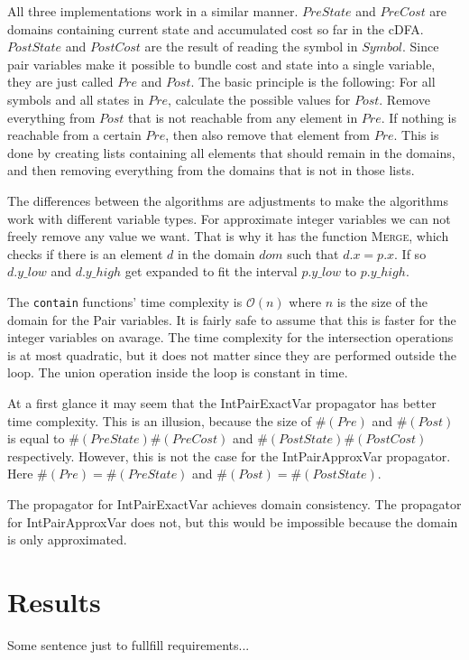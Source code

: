 \documentclass[a4paper,11pt]{article}
\begin{document}
All three implementations work in a similar manner. $PreState$ and $PreCost$ are domains containing current state and accumulated cost so far in the cDFA. $PostState$ and $PostCost$ are the result of reading the symbol in $Symbol$. Since pair variables make it possible to bundle cost and state into a single variable, they are just called $Pre$ and $Post$. The basic principle is the following: For all symbols and all states in $Pre$, calculate the possible values for $Post$. Remove everything from $Post$ that is not reachable from any element in $Pre$. If nothing is reachable from a certain $Pre$, then also remove that element from $Pre$. This is done by creating lists containing all elements that should remain in the domains, and then removing everything from the domains that is not in those lists.



The differences between the algorithms are adjustments to make the algorithms work with different variable types. For approximate integer variables we can not freely remove any value we want. That is why it has the function \textsc{Merge}, which checks if there is an element $d$ in the domain $dom$ such that $d.x=p.x$. If so $d.y\_low$ and $d.y\_high$ get expanded to fit the interval $p.y\_low$ to $p.y\_high$. 

The \texttt{contain} functions' time complexity is $\mathcal{O}(n)$ where $n$ is the size of the domain for the Pair variables. It is fairly safe to assume that this is faster for the integer variables on avarage. The time complexity for the intersection operations is at most quadratic, but it does not matter since they are performed outside the loop. The union operation inside the loop is constant in time.

At a first glance it may seem that the IntPairExactVar propagator has better time complexity. This is an illusion, because the size of $\#(Pre)$ and $\#(Post)$ is equal to $\#(PreState)\#(PreCost)$ and $\#(PostState)\#(PostCost)$ respectively. However, this is not the case for the IntPairApproxVar propagator. Here $\#(Pre)=\#(PreState)$ and $\#(Post)=\#(PostState)$. 

The propagator for IntPairExactVar achieves domain consistency. The propagator for IntPairApproxVar does not, but this would be impossible because the domain is only approximated.

\section{Results}
Some sentence just to fullfill requirements...
\end{document}
